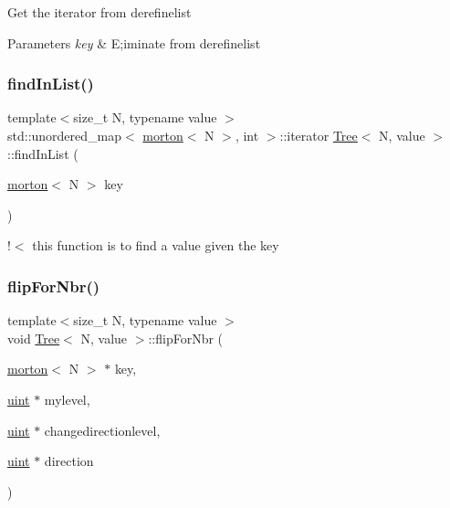 Get the iterator from derefinelist 
\begin{DoxyParams}{Parameters}
{\em key} & E;iminate from derefinelist \\
\hline
\end{DoxyParams}
\mbox{\label{classTree_a9462adc7e7806404cc1b75d9a26894ae}} 
\subsubsection{\texorpdfstring{find\+In\+List()}{findInList()}}
{\footnotesize\ttfamily template$<$size\+\_\+t N, typename value $>$ \\
std\+::unordered\+\_\+map$<$ \mbox{\hyperlink{definitions_8h_af8682350bd8bb38ee9023f7a0a310add}{morton}}$<$ N $>$, int $>$\+::iterator \mbox{\hyperlink{classTree}{Tree}}$<$ N, value $>$\+::find\+In\+List (\begin{DoxyParamCaption}\item[{\mbox{\hyperlink{definitions_8h_af8682350bd8bb38ee9023f7a0a310add}{morton}}$<$ N $>$}]{key }\end{DoxyParamCaption})}

!$<$ this function is to find a value given the key \mbox{\label{classTree_add6b161eec89fc2a372f3e2f46862a98}} 
\subsubsection{\texorpdfstring{flip\+For\+Nbr()}{flipForNbr()}}
{\footnotesize\ttfamily template$<$size\+\_\+t N, typename value $>$ \\
void \mbox{\hyperlink{classTree}{Tree}}$<$ N, value $>$\+::flip\+For\+Nbr (\begin{DoxyParamCaption}\item[{\mbox{\hyperlink{definitions_8h_af8682350bd8bb38ee9023f7a0a310add}{morton}}$<$ N $>$ $\ast$}]{key,  }\item[{\mbox{\hyperlink{definitions_8h_a69aa29b598b851b0640aa225a9e5d61d}{uint}} $\ast$}]{mylevel,  }\item[{\mbox{\hyperlink{definitions_8h_a69aa29b598b851b0640aa225a9e5d61d}{uint}} $\ast$}]{changedirectionlevel,  }\item[{\mbox{\hyperlink{definitions_8h_a69aa29b598b851b0640aa225a9e5d61d}{uint}} $\ast$}]{direction }\end{DoxyParamCaption})}

